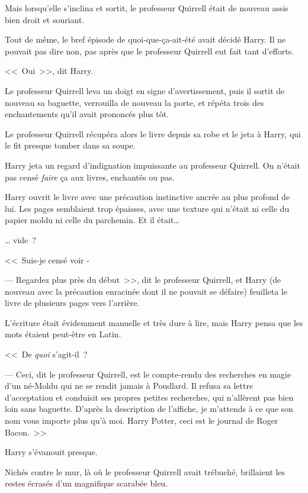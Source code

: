 Mais lorsqu'elle s'inclina et sortit, le professeur Quirrell était de nouveau assis bien droit et souriant.

Tout de même, le bref épisode de quoi-que-ça-ait-été avait décidé Harry. Il ne pouvait pas dire non, pas après que le professeur Quirrell eut fait tant d'efforts.

<<~Oui~>>, dit Harry.

Le professeur Quirrell leva un doigt en signe d'avertissement, puis il sortit de nouveau sa baguette, verrouilla de nouveau la porte, et répéta trois des enchantements qu'il avait prononcés plus tôt.

Le professeur Quirrell récupéra alors le livre depuis sa robe et le jeta à Harry, qui le fit presque tomber dans sa soupe.

Harry jeta un regard d'indignation impuissante au professeur Quirrell. On n'était pas censé \emph{faire} ça aux livres, enchantés ou pas.

Harry ouvrit le livre avec une précaution instinctive ancrée au plus profond de lui. Les pages semblaient trop épaisses, avec une texture qui n'était ni celle du papier moldu ni celle du parchemin. Et il était…

… vide~?

<<~Suis-je censé voir -

--- Regardez plus près du début~>>, dit le professeur Quirrell, et Harry (de nouveau avec la précaution enracinée dont il ne pouvait se défaire) feuilleta le livre de plusieurs pages vers l'arrière.

L'écriture était évidemment manuelle et très dure à lire, mais Harry pensa que les mots étaient peut-être en Latin.

<<~De \emph{quoi} s'agit-il~?

--- Ceci, dit le professeur Quirrell, est le compte-rendu des recherches en magie d'un né-Moldu qui ne se rendit jamais à Poudlard. Il refusa sa lettre d'acceptation et conduisit ses propres petites recherches, qui n'allèrent pas bien loin sans baguette. D'après la description de l'affiche, je m'attends à ce que son nom vous importe plus qu'à moi. Harry Potter, ceci est le journal de Roger Bacon.~>>

Harry s'évanouit presque.

Nichés contre le mur, là où le professeur Quirrell avait trébuché, brillaient les restes écrasés d'un magnifique scarabée bleu.
